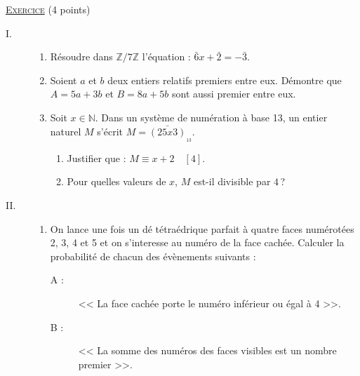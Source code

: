 \noindent \underline{\textsc{Exercice}} (4 points)%
      \begin{description}
            \item[I.] \begin{enumerate}
                        \item R\'esoudre dans $\mathbb{Z}/7\mathbb{Z}$ l'\'equation : $\bar{6} x + \bar{2} = - \bar{3}$.
                        \item Soient $a$ et $b$ deux entiers relatifs premiers entre eux. \newline
                              D\'emontre que $A = 5 a + 3 b $ et $B = 8 a + 5 b $ sont aussi premier entre eux.
                        \item Soit $x \in \mathbb{N}$. \newline
                              Dans un syst\`eme de num\'eration \`a base 13, un entier naturel $M$ s'\'ecrit $ M = \bar{ \left( 25x3 \right) }_{_{13}}$.
                              \begin{enumerate}
                                    \item Justifier que : $M \equiv x+2 \quad [4]$.
                                    \item Pour quelles valeurs de $x$, $M$ est-il divisible par $4$\,?
                              \end{enumerate}
                  \end{enumerate}
            \item[II.] \begin{enumerate}
                        \item On lance une fois un d\'e t\'etra\'edrique parfait \`a quatre faces num\'erot\'ees 2, 3, 4 et 5 et
                              on s'interesse au num\'ero de la face cach\'ee. \newline
                              Calculer la probabilit\'e de chacun des \'ev\`enements suivants :
                              \begin{description}
                                    \item[A :] << La face cach\'ee porte le num\'ero inf\'erieur ou \'egal \`a 4 >>.
                                    \item[B :] << La somme des num\'eros des faces visibles est un nombre premier >>.

\end{description}
\end{enumerate}
\end{description}
